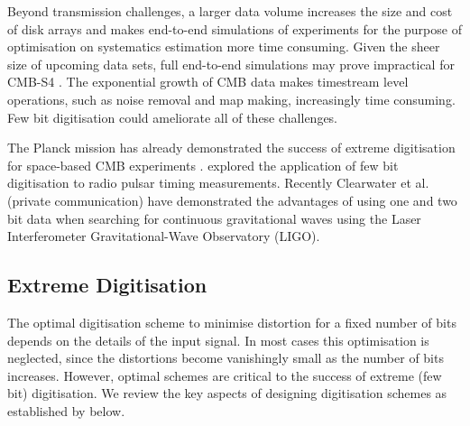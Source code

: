 \documentclass[a4paper,fleqn,usenatbib]{mnras}
\begin{document}


Beyond transmission challenges, a larger data volume increases the size and cost of disk arrays and makes end-to-end simulations of experiments for the purpose of optimisation on systematics estimation more time consuming. Given the sheer size of upcoming data sets, full end-to-end simulations may prove impractical for CMB-S4 \citep{s4sciencebook}. The exponential growth of CMB data makes timestream level operations, such as noise removal and map making, increasingly time consuming. Few bit digitisation could ameliorate all of these challenges.



The Planck mission has already demonstrated the success of extreme digitisation for space-based CMB experiments \citep{maris2003}. \cite{jenet1998} explored the application of few bit digitisation to radio pulsar timing measurements. Recently Clearwater et al. (private communication) have demonstrated the advantages of using one and two bit data when searching for continuous gravitational waves using the Laser Interferometer Gravitational-Wave Observatory (LIGO).

\subsection{Extreme Digitisation}
\label{subsec:extremedigitisation}

The optimal digitisation scheme to minimise distortion for a fixed number of bits depends on the details of the input signal. 
In most cases this optimisation is neglected, since the distortions become vanishingly small as the number of bits increases. However, optimal schemes are critical to the success of extreme (few bit) digitisation. We review the key aspects of designing digitisation schemes as established by \cite{max1960} below.
\end{document}
